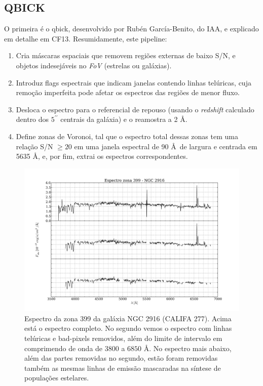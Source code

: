 \subsection{QBICK}

O primeira é o {\sc qbick}, desenvolvido por Rubén García-Benito, do IAA, e explicado em detalhe em CF13. Resumidamente,
este pipeline:

\begin{enumerate}
\item Cria máscaras espaciais que removem regiões externas de baixo S/N, e objetos indesejáveis no {\em FoV} (estrelas
ou galáxias).
\item Introduz flags espectrais que indicam janelas contendo linhas telúricas, cuja remoção imperfeita pode afetar os
espectros das regiões de menor fluxo.
\item Desloca o espectro para o referencial de repouso (usando o {\em redshift} calculado dentro dos $5^{\prime\prime}$
centrais da galáxia) e o reamostra a 2 \AA.
\item Define zonas de Voronoi, tal que o espectro total dessas zonas tem uma relação S/N $\ge 20$ em uma janela
espectral de 90 \AA\ de largura e centrada em 5635 \AA, e, por fim, extrai os espectros correspondentes.
\end{enumerate}

\begin{figure}
    \includegraphics[width=1.0\textwidth]{figuras/K0277-constant_inital_mask-399.pdf}
    \caption[Exemplo de máscaras em um espectro do cubo de dados.]
    {Espectro da zona 399 da galáxia NGC 2916 (CALIFA 277). Acima está o espectro completo. No segundo vemos o espectro
    com linhas telúricas e bad-pixels removidos, além do limite de intervalo em comprimendo de onda de $3800$ a $6850$
    \AA. No espectro mais abaixo, além das partes removidas no segundo, estão foram removidas também as mesmas linhas de
    emissão mascaradas na síntese de populações estelares.}
    \label{fig:checkmask}
\end{figure}

